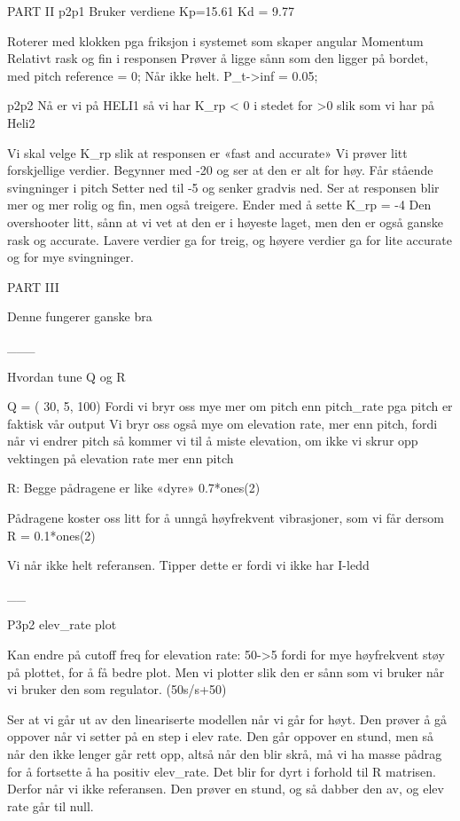 

PART II
p2p1
Bruker verdiene 
Kp=15.61
Kd = 9.77

Roterer med klokken pga friksjon i systemet som skaper angular Momentum
Relativt rask og fin i responsen
Prøver å ligge sånn som den ligger på bordet, med pitch reference = 0; 
Når ikke helt. P_t->inf = 0.05; 




p2p2
Nå er vi på HELI1 så vi har K_rp < 0 i stedet for >0 slik som vi har på Heli2

Vi skal velge K_rp slik at responsen er «fast and accurate» 
Vi prøver litt forskjellige verdier. 
Begynner med -20 og ser at den er alt for høy. Får stående svingninger i pitch
Setter ned til -5 og senker gradvis ned. Ser at responsen blir mer og mer rolig og fin, men også treigere. 
Ender med å sette K_rp = -4 
Den overshooter litt, sånn at vi vet at den er i høyeste laget, men den er også ganske rask og accurate. Lavere verdier ga for treig, og høyere verdier ga for lite accurate og for mye svingninger. 



PART III



Denne fungerer ganske bra

___

Hvordan tune Q og R

Q = ( 30, 5, 100)
Fordi vi bryr oss mye mer om pitch enn pitch_rate pga pitch er faktisk vår output 
Vi bryr oss også mye om elevation rate, mer enn pitch, fordi når vi endrer pitch så kommer vi til å miste elevation, om ikke vi skrur opp vektingen på elevation rate mer enn pitch

R:  Begge pådragene er like «dyre» 0.7*ones(2) 

Pådragene koster oss litt for å unngå høyfrekvent vibrasjoner, som vi får dersom R = 0.1*ones(2) 


Vi når ikke helt referansen. Tipper dette er fordi vi ikke har I-ledd

__


P3p2 elev_rate plot

Kan endre på cutoff freq for elevation rate: 50->5 fordi for mye høyfrekvent støy på plottet, for å få bedre plot. 
Men vi plotter slik den er sånn som vi bruker når vi bruker den som regulator. (50s/s+50)

Ser at vi går ut av den lineariserte modellen når vi går for høyt. Den prøver å gå oppover når vi setter på en step i elev rate. Den går oppover en stund, men så når den ikke lenger går rett opp, altså når den blir skrå, må vi ha masse pådrag for å fortsette å ha positiv elev_rate. Det blir for dyrt i forhold til R matrisen. 
Derfor når vi ikke referansen. Den prøver en stund, og så dabber den av, og elev rate går til null. 


